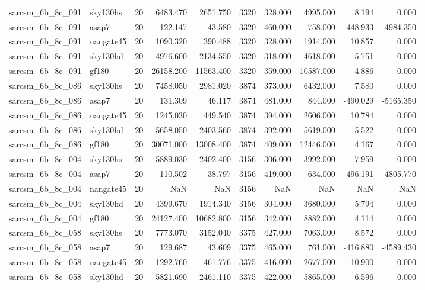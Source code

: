 \begin{tabular}{llrrrrrrrr}
sarcsm\_6b\_8c\_091 & sky130hs & 20 & 6483.470 & 2651.750 & 3320 & 328.000 & 4995.000 & 8.194 & 0.000 \\
sarcsm\_6b\_8c\_091 & asap7 & 20 & 122.147 & 43.580 & 3320 & 460.000 & 758.000 & -448.933 & -4984.350 \\
sarcsm\_6b\_8c\_091 & nangate45 & 20 & 1090.320 & 390.488 & 3320 & 328.000 & 1914.000 & 10.857 & 0.000 \\
sarcsm\_6b\_8c\_091 & sky130hd & 20 & 4976.600 & 2134.550 & 3320 & 318.000 & 4618.000 & 5.751 & 0.000 \\
sarcsm\_6b\_8c\_091 & gf180 & 20 & 26158.200 & 11563.400 & 3320 & 359.000 & 10587.000 & 4.886 & 0.000 \\
sarcsm\_6b\_8c\_086 & sky130hs & 20 & 7458.050 & 2981.020 & 3874 & 373.000 & 6432.000 & 7.580 & 0.000 \\
sarcsm\_6b\_8c\_086 & asap7 & 20 & 131.309 & 46.117 & 3874 & 481.000 & 844.000 & -490.029 & -5165.350 \\
sarcsm\_6b\_8c\_086 & nangate45 & 20 & 1245.030 & 449.540 & 3874 & 394.000 & 2606.000 & 10.784 & 0.000 \\
sarcsm\_6b\_8c\_086 & sky130hd & 20 & 5658.050 & 2403.560 & 3874 & 392.000 & 5619.000 & 5.522 & 0.000 \\
sarcsm\_6b\_8c\_086 & gf180 & 20 & 30071.000 & 13008.400 & 3874 & 409.000 & 12446.000 & 4.167 & 0.000 \\
sarcsm\_6b\_8c\_004 & sky130hs & 20 & 5889.030 & 2402.400 & 3156 & 306.000 & 3992.000 & 7.959 & 0.000 \\
sarcsm\_6b\_8c\_004 & asap7 & 20 & 110.502 & 38.797 & 3156 & 419.000 & 634.000 & -496.191 & -4805.770 \\
sarcsm\_6b\_8c\_004 & nangate45 & 20 & NaN & NaN & 3156 & NaN & NaN & NaN & NaN \\
sarcsm\_6b\_8c\_004 & sky130hd & 20 & 4399.670 & 1914.340 & 3156 & 304.000 & 3680.000 & 5.794 & 0.000 \\
sarcsm\_6b\_8c\_004 & gf180 & 20 & 24127.400 & 10682.800 & 3156 & 342.000 & 8882.000 & 4.114 & 0.000 \\
sarcsm\_6b\_8c\_058 & sky130hs & 20 & 7773.070 & 3152.040 & 3375 & 427.000 & 7063.000 & 8.572 & 0.000 \\
sarcsm\_6b\_8c\_058 & asap7 & 20 & 129.687 & 43.609 & 3375 & 465.000 & 761.000 & -416.880 & -4589.430 \\
sarcsm\_6b\_8c\_058 & nangate45 & 20 & 1292.760 & 461.776 & 3375 & 416.000 & 2677.000 & 10.900 & 0.000 \\
sarcsm\_6b\_8c\_058 & sky130hd & 20 & 5821.690 & 2461.110 & 3375 & 422.000 & 5865.000 & 6.596 & 0.000 \\

\end{tabular}
